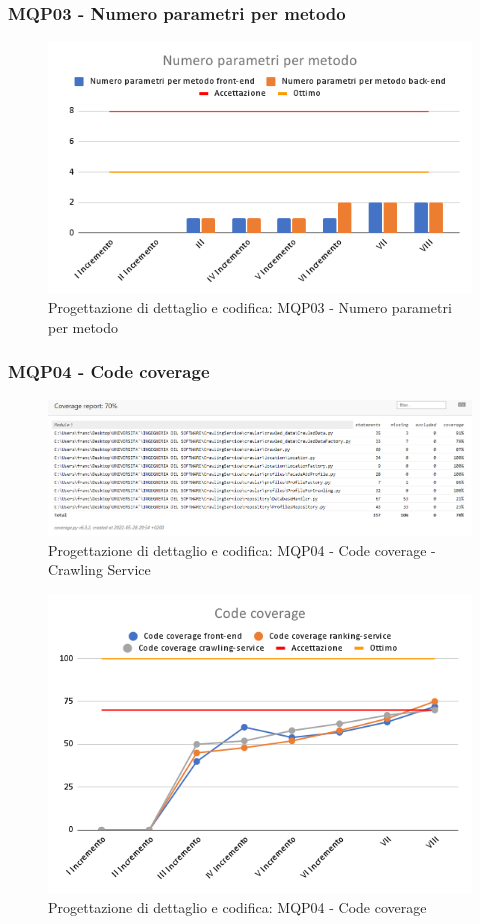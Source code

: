 \subsubsection{MQP03 - Numero parametri per metodo}
\begin{figure}[H]
    \centering
    \includegraphics[scale=0.50]{Sezioni/images/pb prodotto/Numero parametri per metodo.png}
    \caption{Progettazione di dettaglio e codifica: MQP03 - Numero parametri per metodo}
\end{figure}
\subsubsection{MQP04 - Code coverage}
\begin{figure}[H]
    \centering
    \includegraphics[scale=0.50]{Sezioni/images/pb prodotto/coverage-CS.PNG}
    \caption{Progettazione di dettaglio e codifica: MQP04 - Code coverage - Crawling Service}
\end{figure}
\begin{figure}[H]
    \centering
    \includegraphics[scale=0.50]{Sezioni/images/pb prodotto/Code coverage.png}
    \caption{Progettazione di dettaglio e codifica: MQP04 - Code coverage}
\end{figure}
